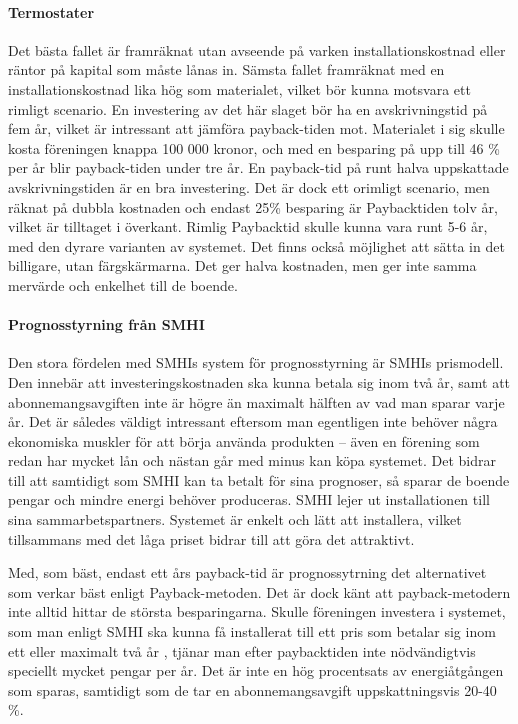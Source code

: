 \paragraph{Termostater}
Det bästa fallet är framräknat utan avseende på varken installationskostnad eller räntor på kapital som måste lånas in. Sämsta fallet framräknat med en installationskostnad lika hög som materialet, vilket bör kunna motsvara ett rimligt scenario. En investering av det här slaget bör ha en avskrivningstid på fem år, vilket är intressant att jämföra payback-tiden mot. Materialet i sig skulle kosta föreningen knappa 100 000 kronor, och med en besparing på upp till 46 \% \cite{danfoss} per år blir payback-tiden under tre år. En payback-tid på runt halva uppskattade avskrivningstiden är en bra investering. Det är dock ett orimligt scenario, men räknat på dubbla kostnaden och endast 25\% besparing är Paybacktiden tolv år, vilket är tilltaget i överkant. Rimlig Paybacktid skulle kunna vara runt 5-6 år, med den dyrare varianten av systemet. Det finns också möjlighet att sätta in det billigare, utan färgskärmarna. Det ger halva kostnaden, men ger inte samma mervärde och enkelhet till de boende.

\paragraph{Prognosstyrning från SMHI}
Den stora fördelen med SMHIs system för prognosstyrning är SMHIs prismodell. Den innebär att investeringskostnaden ska kunna betala sig inom två år, samt att abonnemangsavgiften inte är högre än maximalt hälften av vad man sparar varje år. Det är således väldigt intressant eftersom man egentligen inte behöver några ekonomiska muskler för att börja använda produkten – även en förening som redan har mycket lån och nästan går med minus kan köpa systemet. Det bidrar till att samtidigt som SMHI kan ta betalt för sina prognoser, så sparar de boende pengar och mindre energi behöver produceras. SMHI lejer ut installationen till sina sammarbetspartners. Systemet är enkelt och lätt att installera, vilket tillsammans med det låga priset bidrar till att göra det attraktivt.

Med, som bäst, endast ett års payback-tid är prognossytrning det alternativet som verkar bäst enligt Payback-metoden. Det är dock känt att payback-metodern inte alltid hittar de största besparingarna. Skulle föreningen investera i systemet, som man enligt SMHI ska kunna få installerat till ett pris som betalar sig inom ett eller maximalt två år \cite{smhi1}\cite{smhi2}, tjänar man efter paybacktiden inte nödvändigtvis speciellt mycket pengar per år. Det är inte en hög procentsats av energiåtgången som sparas, samtidigt som de tar en abonnemangsavgift uppskattningsvis 20-40 \%. \cite{smhi1}\cite{smhi2}

